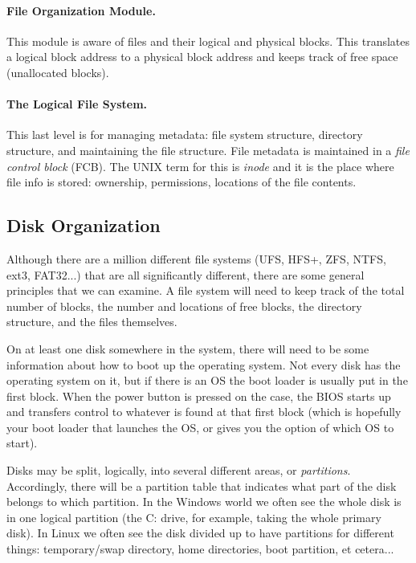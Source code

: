 \paragraph{File Organization Module.} This module is aware of files and their logical and physical blocks. This translates a logical block address to a physical block address and keeps track of free space (unallocated blocks).

\paragraph{The Logical File System.} This last level is for managing metadata: file system structure, directory structure, and maintaining the file structure. File metadata is maintained in a \textit{file control block} (FCB). The UNIX term for this is \textit{inode} and it is the place where file info is stored: ownership, permissions, locations of the file contents.

\subsection*{Disk Organization}

Although there are a million different file systems (UFS, HFS+, ZFS, NTFS, ext3, FAT32...) that are all significantly different, there are some general principles that we can examine. A file system will need to keep track of the total number of blocks, the number and locations of free blocks, the directory structure, and the files themselves.

On at least one disk somewhere in the system, there will need to be some information about how to boot up the operating system. Not every disk has the operating system on it, but if there is an OS the boot loader is usually put in the first block. When the power button is pressed on the case, the BIOS starts up and transfers control to whatever is found at that first block (which is hopefully your boot loader that launches the OS, or gives you the option of which OS to start).

Disks may be split, logically, into several different areas, or \textit{partitions}. Accordingly, there will be a partition table that indicates what part of the disk belongs to which partition. In the Windows world we often see the whole disk is in one logical partition (the C: drive, for example, taking the whole primary disk). In Linux we often see the disk divided up to have partitions for different things: temporary/swap directory, home directories, boot partition, et cetera...

